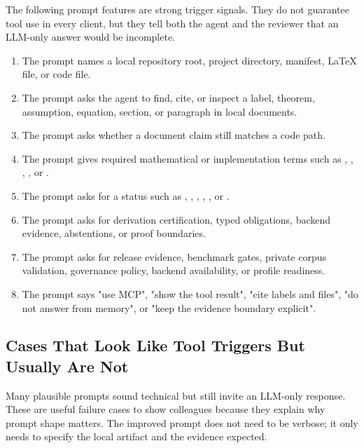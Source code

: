 \documentclass[12pt,a4paper,openany]{book}
\begin{document}
The following prompt features are strong trigger signals. They do not guarantee
tool use in every client, but they tell both the agent and the reviewer that an
LLM-only answer would be incomplete.

\begin{enumerate}[label=\arabic*.]
  \item The prompt names a local repository root, project directory, manifest,
        LaTeX file, or code file.
  \item The prompt asks the agent to find, cite, or inspect a label, theorem,
        assumption, equation, section, or paragraph in local documents.
  \item The prompt asks whether a document claim still matches a code path.
  \item The prompt gives required mathematical or implementation terms such as
        , , , , or
        .
  \item The prompt asks for a status such as ,
        , , ,
        , or .
  \item The prompt asks for derivation certification, typed obligations,
        backend evidence, abstentions, or proof boundaries.
  \item The prompt asks for release evidence, benchmark gates, private corpus
        validation, governance policy, backend availability, or profile
        readiness.
  \item The prompt says "use MCP", "show the tool result", "cite labels and
        files", "do not answer from memory", or "keep the evidence boundary
        explicit".
\end{enumerate}

\subsection*{Cases That Look Like Tool Triggers But Usually Are Not}

Many plausible prompts sound technical but still invite an LLM-only response.
These are useful failure cases to show colleagues because they explain why
prompt shape matters. The improved prompt does not need to be verbose; it only
needs to specify the local artifact and the evidence expected.
\end{document}
